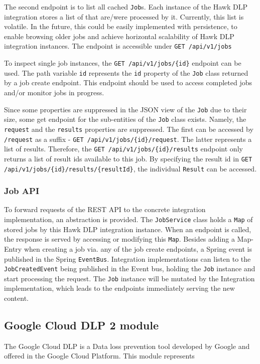 The second endpoint is to list all cached \texttt{Job}s. Each instance of the Hawk DLP integration stores a list of that are/were processed by it. Currently, this list is volatile. In the future, this could be easily implemented with persistence, to enable browsing older jobs and achieve horizontal scalability of Hawk DLP integration instances. The endpoint is accessible under \texttt{GET /api/v1/jobs}

To inspect single job instances, the \texttt{GET /api/v1/jobs/\{id\}} endpoint can be used. The path variable \texttt{id} represents the \texttt{id} property of the \texttt{Job} class returned by a job create endpoint. This endpoint should be used to access completed jobs and/or monitor jobs in progress.

Since some properties are suppressed in the JSON view of the \texttt{Job} due to their size, some get endpoint for the sub-entities of the \texttt{Job} class exists.
Namely, the \texttt{request} and the \texttt{results} properties are suppressed. The first can be accessed by \texttt{/request} as a suffix - \texttt{GET /api/v1/jobs/\{id\}/request}. The latter represents a list of results. Therefore, the \texttt{GET /api/v1/jobs/\{id\}/results} endpoint only returns a list of result ids available to this job. By specifying the result id in \texttt{GET /api/v1/jobs/\{id\}/results/\{resultId\}}, the individual \texttt{Result} can be accessed.

\subsubsection{Job API}

To forward requests of the REST API to the concrete integration implementation, an abstraction is provided. The \texttt{JobService} class holds a \texttt{Map} of stored jobs by this Hawk DLP integration instance. When an endpoint is called, the response is served by accessing or modifying this \texttt{Map}. Besides adding a Map-Entry when creating a job via. any of the job create endpoints, a Spring event is published in the Spring \texttt{EventBus}. Integration implementations can listen to the \texttt{JobCreatedEvent} being published in the Event bus, holding the \texttt{Job} instance and start processing the request. The \texttt{Job} instance will be mutated by the Integration implementation, which leads to the endpoints immediately serving the new content.

\subsection{Google Cloud DLP 2 module}
The Google Cloud DLP is a Data loss prevention tool developed by Google and offered in the Google Cloud Platform. This module represents 



